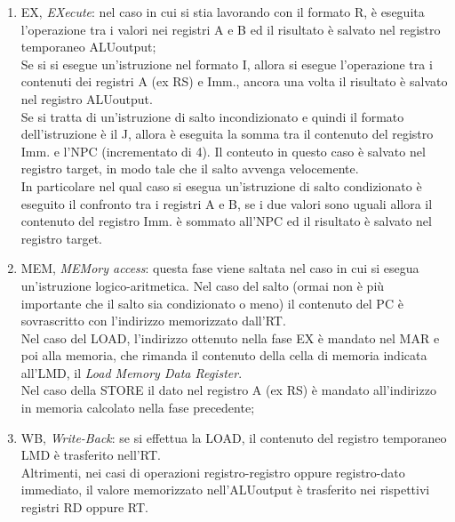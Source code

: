 \documentclass{article}
\begin{document}
\begin{enumerate}
	\item EX, \textit{EXecute}: nel caso in cui si stia lavorando con il formato R, è eseguita l'operazione tra i valori nei registri A e B ed il risultato è salvato nel registro temporaneo ALUoutput; \\
	Se si si esegue un'istruzione nel formato I, allora si esegue l'operazione tra i contenuti dei registri A (ex RS) e Imm., ancora una volta il risultato è salvato nel registro ALUoutput.\\
	Se si tratta di un'istruzione di salto incondizionato e quindi il formato dell'istruzione è il J, allora è eseguita la somma tra il contenuto del registro Imm. e l'NPC (incrementato di 4). Il conteuto in questo caso è salvato nel registro target, in modo tale che il salto avvenga velocemente.\\
	In particolare nel qual caso si esegua un'istruzione di salto condizionato è eseguito il confronto tra i registri A e B, se i due valori sono uguali allora il contenuto del registro Imm. è sommato all'NPC ed il risultato è salvato nel registro target.\\

	\item MEM, \textit{MEMory access}: questa fase viene saltata nel caso in cui si esegua un'istruzione logico-aritmetica. Nel caso del salto (ormai non è più importante che il salto sia condizionato o meno) il contenuto del PC è sovrascritto con l'indirizzo memorizzato dall'RT.\\
	Nel caso del LOAD, l'indirizzo ottenuto nella fase EX è mandato nel MAR e poi alla memoria, che rimanda il contenuto della cella di memoria indicata all'LMD, il \textit{Load Memory Data Register}.\\
	Nel caso della STORE il dato nel registro A (ex RS) è mandato all'indirizzo in memoria calcolato nella fase precedente;

	\item WB, \textit{Write-Back}: se si effettua la LOAD, il contenuto del registro temporaneo LMD è trasferito nell'RT. \\
	Altrimenti, nei casi di operazioni registro-registro oppure registro-dato immediato, il valore memorizzato nell'ALUoutput è trasferito nei rispettivi registri RD oppure RT.
\end{enumerate}
\end{document}
